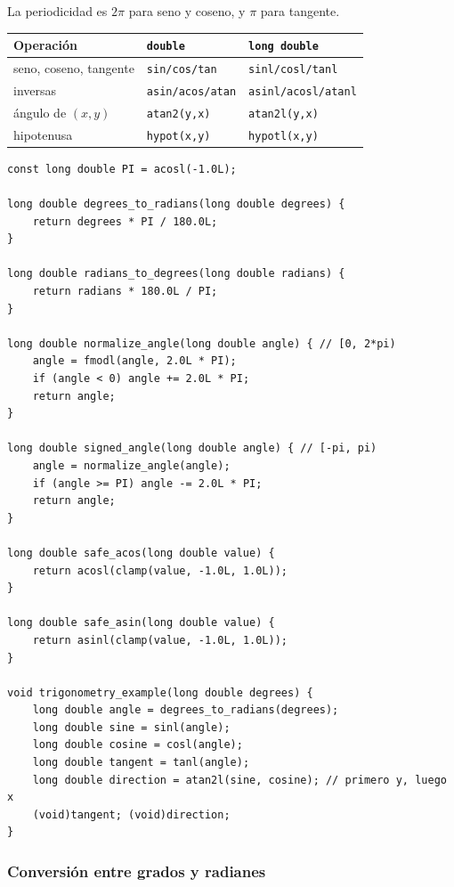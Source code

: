 La periodicidad es $2\pi$ para seno y coseno, y $\pi$ para tangente.

\begin{center}
\begin{tabular}{lll}
Operaci\'on & \texttt{double} & \texttt{long double} \\
\hline
seno, coseno, tangente & \texttt{sin/cos/tan} & \texttt{sinl/cosl/tanl} \\
inversas & \texttt{asin/acos/atan} & \texttt{asinl/acosl/atanl} \\
\'angulo de $(x,y)$ & \texttt{atan2(y,x)} & \texttt{atan2l(y,x)} \\
hipotenusa & \texttt{hypot(x,y)} & \texttt{hypotl(x,y)} \\
\end{tabular}
\end{center}

\begin{lstlisting}[style=cpp]
const long double PI = acosl(-1.0L);

long double degrees_to_radians(long double degrees) {
    return degrees * PI / 180.0L;
}

long double radians_to_degrees(long double radians) {
    return radians * 180.0L / PI;
}

long double normalize_angle(long double angle) { // [0, 2*pi)
    angle = fmodl(angle, 2.0L * PI);
    if (angle < 0) angle += 2.0L * PI;
    return angle;
}

long double signed_angle(long double angle) { // [-pi, pi)
    angle = normalize_angle(angle);
    if (angle >= PI) angle -= 2.0L * PI;
    return angle;
}

long double safe_acos(long double value) {
    return acosl(clamp(value, -1.0L, 1.0L));
}

long double safe_asin(long double value) {
    return asinl(clamp(value, -1.0L, 1.0L));
}

void trigonometry_example(long double degrees) {
    long double angle = degrees_to_radians(degrees);
    long double sine = sinl(angle);
    long double cosine = cosl(angle);
    long double tangent = tanl(angle);
    long double direction = atan2l(sine, cosine); // primero y, luego x
    (void)tangent; (void)direction;
}
\end{lstlisting}

\subsubsection{Conversi\'on entre grados y radianes}

